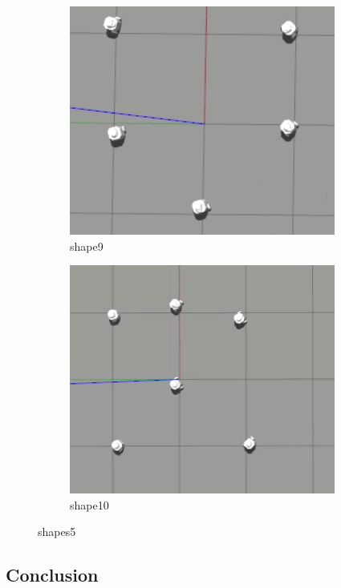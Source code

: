 \documentclass[12pt]{extarticle}
\begin{document}
\begin{figure}
\centering
\begin{subfigure}{.5\textwidth}
  \centering
  \includegraphics[width=.8\linewidth]{shape9}
  \caption{shape9}
  \label{fig:sub1}
\end{subfigure}%
\begin{subfigure}{.5\textwidth}
  \centering
  \includegraphics[width=.8\linewidth]{shape10}
  \caption{shape10}
  \label{fig:sub2}
\end{subfigure}
\caption{shapes5}
\label{fig:test}



\end{figure}








\afterpage{\clearpage}
 \newpage
\pagebreak
\hspace{0pt}
\vfill
\begin{center}
\section{Conclusion}
\end{center}
\vfill
\hspace{0pt}
\end{document}
